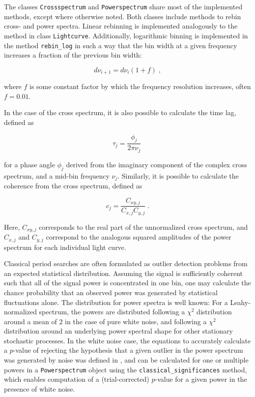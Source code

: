 \documentclass[twocolumn]{aastex62}
\newcommand{\lightcurve}{\texttt{Lightcurve}\xspace}
\newcommand{\crossspectrum}{\texttt{Crossspectrum}\xspace}
\newcommand{\powerspectrum}{\texttt{Powerspectrum}\xspace}
\begin{document}
The classes \crossspectrum and \powerspectrum share most of the implemented methods, except where otherwise noted. Both classes include methods to rebin cross- and power spectra. Linear rebinning is implemented analogously to the method in class \lightcurve. Additionally, logarithmic binning is implemented in the method \texttt{rebin\_log} in such a way that the bin width at a given frequency increases a fraction of the previous bin width:

\[
d\nu_{i+1} = d\nu_{i} (1 + f) \; ,
\]

\noindent where $f$ is some constant factor by which the frequency resolution increases, often $f = 0.01$. 

In the case of the cross spectrum, it is also possible to calculate the time lag, defined as

\[
\tau_j = \frac{\phi_j}{2\pi\nu_j} \; 
\]

\noindent for a phase angle $\phi_j$ derived from the imaginary component of the complex cross spectrum, and a mid-bin frequency $\nu_j$. Similarly, it is possible to calculate the coherence \citep{vaughan1997,nowak1999} from the cross spectrum, defined as 

\begin{equation}
c_j = \frac{C_{xy,j}}{C_{x,j} C_{y,j}} \; . 
\end{equation}

\noindent Here, $C_{xy,j}$ corresponds to the real part of the unnormalized cross spectrum, and $C_{x,j}$ and $C_{y,j}$ correspond to the analogous squared amplitudes of the power spectrum for each individual light curve. 

Classical period searches are often formulated as outlier detection problems from an expected statistical distribution. Assuming the signal is sufficiently coherent such that all of the signal power is concentrated in one bin, one may calculate the chance probability that an observed power was generated by statistical fluctuations alone. The distribution for power spectra is well known: For a Leahy-normalized spectrum, the powers are distributed following a $\chi^2$ distribution around a mean of $2$ in the case of pure white noise, and following a $\chi^2$ distribution around an underlying power spectral shape for other stationary stochastic processes. In the white noise case, the equations to accurately calculate a $p$-value of rejecting the hypothesis that a given outlier in the power spectrum was generated by noise was defined in \citep{Groth1975}, and can be calculated for one or multiple powers in a \powerspectrum object using the \verb|classical_significances| method, which enables computation of a (trial-corrected) $p$-value for a given power in the presence of white noise.%
\end{document}
